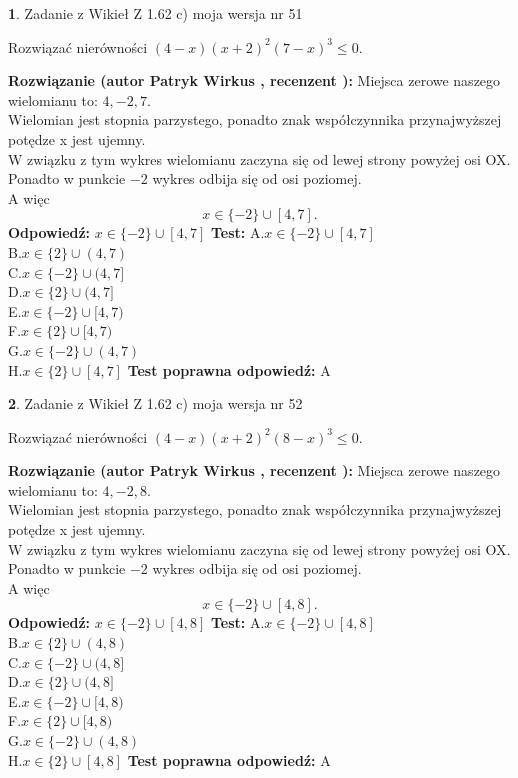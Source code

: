 \documentclass[12pt, a4paper]{article}
\theoremstyle{definition} %
\newtheorem{zad}{}
\newcommand{\zadStart}[1]{\begin{zad}#1\newline}
\newcommand{\zadStop}{\end{zad}}
\newcommand{\rozwStart}[2]{\noindent \textbf{Rozwiązanie (autor #1 , recenzent #2): }\newline}
\newcommand{\rozwStop}{\newline}
\newcommand{\odpStart}{\noindent \textbf{Odpowiedź:}\newline}
\newcommand{\odpStop}{\newline}
\newcommand{\testStart}{\noindent \textbf{Test:}\newline}
\newcommand{\testStop}{\newline}
\newcommand{\kluczStart}{\noindent \textbf{Test poprawna odpowiedź:}\newline}
\newcommand{\kluczStop}{\newline}
\begin{document}
\zadStart{Zadanie z Wikieł Z 1.62 c) moja wersja nr 51}

Rozwiązać nierówności $(4-x)(x+2)^{2}(7-x)^{3}\le0$.
\zadStop
\rozwStart{Patryk Wirkus}{}
Miejsca zerowe naszego wielomianu to: $4, -2, 7$.\\
Wielomian jest stopnia parzystego, ponadto znak współczynnika przy\linebreak najwyższej potędze x jest ujemny.\\ W związku z tym wykres wielomianu zaczyna się od lewej strony powyżej osi OX.\\
Ponadto w punkcie $-2$ wykres odbija się od osi poziomej.\\
A więc $$x \in \{-2\} \cup [4,7].$$
\rozwStop
\odpStart
$x \in \{-2\} \cup [4,7]$
\odpStop
\testStart
A.$x \in \{-2\} \cup [4,7]$\\
B.$x \in \{2\} \cup (4,7)$\\
C.$x \in \{-2\} \cup (4,7]$\\
D.$x \in \{2\} \cup (4,7]$\\
E.$x \in \{-2\} \cup [4,7)$\\
F.$x \in \{2\} \cup [4,7)$\\
G.$x \in \{-2\} \cup (4,7)$\\
H.$x \in \{2\} \cup [4,7]$
\testStop
\kluczStart
A
\kluczStop



\zadStart{Zadanie z Wikieł Z 1.62 c) moja wersja nr 52}

Rozwiązać nierówności $(4-x)(x+2)^{2}(8-x)^{3}\le0$.
\zadStop
\rozwStart{Patryk Wirkus}{}
Miejsca zerowe naszego wielomianu to: $4, -2, 8$.\\
Wielomian jest stopnia parzystego, ponadto znak współczynnika przy\linebreak najwyższej potędze x jest ujemny.\\ W związku z tym wykres wielomianu zaczyna się od lewej strony powyżej osi OX.\\
Ponadto w punkcie $-2$ wykres odbija się od osi poziomej.\\
A więc $$x \in \{-2\} \cup [4,8].$$
\rozwStop
\odpStart
$x \in \{-2\} \cup [4,8]$
\odpStop
\testStart
A.$x \in \{-2\} \cup [4,8]$\\
B.$x \in \{2\} \cup (4,8)$\\
C.$x \in \{-2\} \cup (4,8]$\\
D.$x \in \{2\} \cup (4,8]$\\
E.$x \in \{-2\} \cup [4,8)$\\
F.$x \in \{2\} \cup [4,8)$\\
G.$x \in \{-2\} \cup (4,8)$\\
H.$x \in \{2\} \cup [4,8]$
\testStop
\kluczStart
A
\kluczStop
\end{document}
